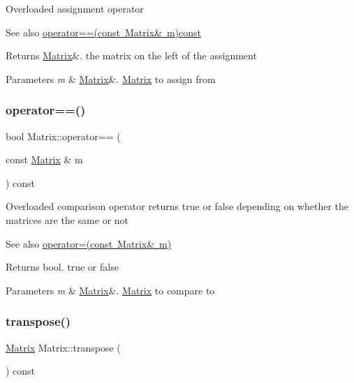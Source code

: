 Overloaded assignment operator \begin{DoxySeeAlso}{See also}
\mbox{\hyperlink{class_matrix_a35097c20bcb1495b57d452db0d7b1f53}{operator==(const Matrix\& m)const}} 
\end{DoxySeeAlso}
\begin{DoxyReturn}{Returns}
\mbox{\hyperlink{class_matrix}{Matrix}}\&. the matrix on the left of the assignment 
\end{DoxyReturn}

\begin{DoxyParams}{Parameters}
{\em m} & \mbox{\hyperlink{class_matrix}{Matrix}}\&. \mbox{\hyperlink{class_matrix}{Matrix}} to assign from \\
\hline
\end{DoxyParams}
\mbox{\label{class_matrix_a35097c20bcb1495b57d452db0d7b1f53}} 
\subsubsection{\texorpdfstring{operator==()}{operator==()}}
{\footnotesize\ttfamily bool Matrix\+::operator== (\begin{DoxyParamCaption}\item[{const \mbox{\hyperlink{class_matrix}{Matrix}} \&}]{m }\end{DoxyParamCaption}) const}

Overloaded comparison operator returns true or false depending on whether the matrices are the same or not \begin{DoxySeeAlso}{See also}
\mbox{\hyperlink{class_matrix_aea5a06385f646eb4a63929fae6fa3e14}{operator=(const Matrix\& m)}} 
\end{DoxySeeAlso}
\begin{DoxyReturn}{Returns}
bool. true or false 
\end{DoxyReturn}

\begin{DoxyParams}{Parameters}
{\em m} & \mbox{\hyperlink{class_matrix}{Matrix}}\&. \mbox{\hyperlink{class_matrix}{Matrix}} to compare to \\
\hline
\end{DoxyParams}
\mbox{\label{class_matrix_a759661b75b9681f3a89ff75e27933b3a}} 
\subsubsection{\texorpdfstring{transpose()}{transpose()}}
{\footnotesize\ttfamily \mbox{\hyperlink{class_matrix}{Matrix}} Matrix\+::transpose (\begin{DoxyParamCaption}{ }\end{DoxyParamCaption}) const}

